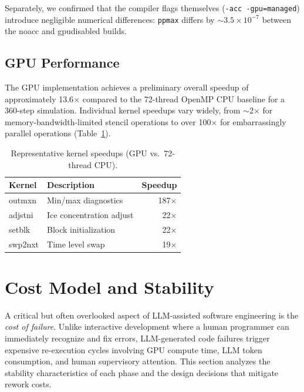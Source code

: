 \documentclass[conference]{IEEEtran}
\begin{document}
Separately, we confirmed that the compiler flags themselves
(\texttt{-acc -gpu=managed}) introduce negligible numerical differences:
\texttt{ppmax} differs by $\sim 3.5 \times 10^{-7}$ between the noacc and
gpudisabled builds.

\subsection{GPU Performance}

The GPU implementation achieves a preliminary overall speedup of
approximately 13.6$\times$ compared to the 72-thread OpenMP CPU baseline
for a 360-step simulation. Individual kernel speedups vary widely, from
$\sim$2$\times$ for memory-bandwidth-limited stencil operations to over
100$\times$ for embarrassingly parallel operations
(Table~\ref{tab:performance}).

\begin{table}[t]
\centering
\caption{Representative kernel speedups (GPU vs.\ 72-thread CPU).}
\label{tab:performance}
\begin{tabular}{llr}
\toprule
Kernel & Description & Speedup \\
\midrule
outmxn & Min/max diagnostics & 187$\times$ \\
adjstni & Ice concentration adjust & 22$\times$ \\
setblk & Block initialization & 22$\times$ \\
swp2nxt & Time level swap & 19$\times$ \\
\bottomrule
\end{tabular}
\end{table}

\section{Cost Model and Stability}
\label{sec:cost}

A critical but often overlooked aspect of LLM-assisted software engineering
is the \emph{cost of failure}. Unlike interactive development where a human
programmer can immediately recognize and fix errors, LLM-generated code
failures trigger expensive re-execution cycles involving GPU compute time,
LLM token consumption, and human supervisory attention. This section
analyzes the stability characteristics of each phase and the design
decisions that mitigate rework costs.
\end{document}

